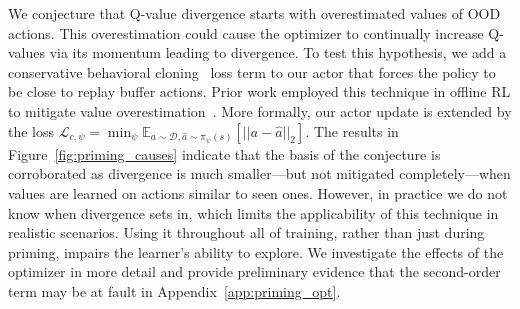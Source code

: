 We conjecture that Q-value divergence starts with overestimated values of OOD actions. This overestimation could cause the optimizer to continually increase Q-values via its momentum leading to divergence. 
To test this hypothesis, we add a conservative behavioral cloning~\parencite{pomerleau1988alvinn, atkeson1997robot} loss term to our actor that forces the policy to be close to replay buffer actions. Prior work employed this technique in offline RL to mitigate value overestimation~\parencite{fujimoto2021td3bc}. More formally, our actor update is extended by the loss $
        \mathcal{L}_{c, \psi} = \min_{\psi} \mathbb{E}_{a \sim \mathcal{D}, \hat{a} \sim \pi_{\psi}(s)}[||a - \hat{a}||_2]$. 
The results in Figure~\ref{fig:priming_causes} indicate that the basis of the conjecture is corroborated as divergence is much smaller---but not mitigated completely---when values are learned on actions similar to seen ones. However, in practice we do not know when divergence sets in, which limits the applicability of this technique in realistic scenarios. Using it throughout all of training, rather than just during priming, impairs the learner's ability to explore. We investigate the effects of the optimizer in more detail and provide preliminary evidence that the second-order term may be at fault in Appendix~\ref{app:priming_opt}. 



